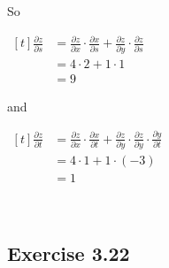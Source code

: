\documentclass[11pt,fleqn]{book} %
\begin{document}
{~~~}

{~~~}

So \begin{minipage}[t]{0.3\linewidth}
    $\begin{aligned}[t]
        \frac{\partial z}{\partial s} 
         & = \frac{\partial z}{\partial x} \cdot \frac{\partial x}{\partial s} + \frac{\partial z}{\partial y} \cdot \frac{\partial z}{\partial s} \\
         & = 4 \cdot 2 + 1 \cdot 1 \\
         & = 9
    \end{aligned}$
\end{minipage} and \qquad\begin{minipage}[t]{0.33\linewidth}
    $\begin{aligned}[t]
        \frac{\partial z}{\partial t}
         & = \frac{\partial z}{\partial x} \cdot \frac{\partial x}{\partial t} + \frac{\partial z}{\partial y} \cdot \frac{\partial z}{\partial y} \cdot \frac{\partial y}{\partial t} \\
         & = 4 \cdot 1 + 1 \cdot (-3) \\
         & = 1
    \end{aligned}$
\end{minipage}

{~~~}

\subsection*{Exercise 3.22}
\end{document}
